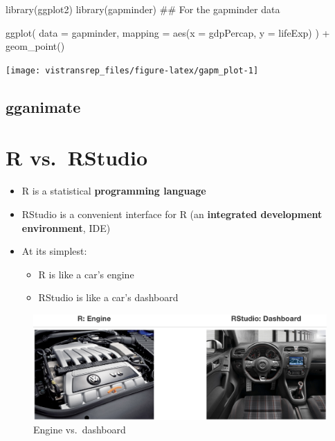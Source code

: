 \documentclass[]{book}
\newenvironment{Shaded}{}{}
\newcommand{\DataTypeTok}[1]{#1}
\newcommand{\KeywordTok}[1]{\textcolor[rgb]{0.00,0.00,1.00}{#1}}
\newcommand{\NormalTok}[1]{#1}
\newcommand{\OperatorTok}[1]{#1}
\newcommand{\StringTok}[1]{\textcolor[rgb]{0.00,0.50,0.50}{#1}}
\providecommand{\tightlist}{%
  \setlength{\itemsep}{0pt}\setlength{\parskip}{0pt}}
\begin{document}
\begin{Shaded}
\begin{Highlighting}[]
\KeywordTok{library}\NormalTok{(ggplot2)}
\KeywordTok{library}\NormalTok{(gapminder) ## For the gapminder data}

\KeywordTok{ggplot}\NormalTok{(}
  \DataTypeTok{data =}\NormalTok{ gapminder,}
  \DataTypeTok{mapping =} \KeywordTok{aes}\NormalTok{(}\DataTypeTok{x =}\NormalTok{ gdpPercap, }\DataTypeTok{y =}\NormalTok{ lifeExp)}
\NormalTok{) }\OperatorTok{+}
\StringTok{  }\KeywordTok{geom_point}\NormalTok{()}
\end{Highlighting}
\end{Shaded}

\begin{flushright}\texttt{[image: vistransrep\_files/figure-latex/gapm\_plot-1]} \end{flushright}

\hypertarget{gganimate}{%
\subsection{gganimate}\label{gganimate}}

\hypertarget{r-vs.rstudio}{%
\section{R vs.~RStudio}\label{r-vs.rstudio}}

\begin{itemize}
\tightlist
\item
  R is a statistical \textbf{programming language}
\item
  RStudio is a convenient interface for R (an \textbf{integrated development environment}, IDE)
\item
  At its simplest:

  \begin{itemize}
  \tightlist
  \item
    R is like a car's engine
  \item
    RStudio is like a car's dashboard
  \end{itemize}
\end{itemize}

\begin{figure}
\centering
\includegraphics{img/engine-dashboard.png}
\caption{Engine vs.~dashboard}
\end{figure}
\end{document}
